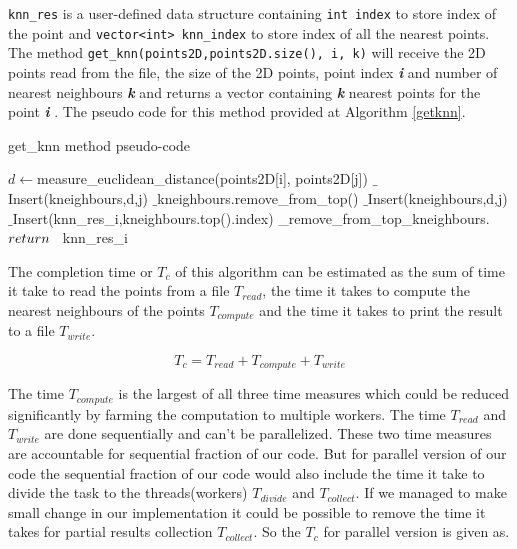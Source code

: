\documentclass[12pt,a4paper]{report}
\begin{document}
\verb!knn_res! is a user-defined data structure containing \verb!int index! to store index of the point and \verb!vector<int> knn_index! to store index of all the nearest points. The method \verb!get_knn(points2D,points2D.size(), i, k)! will receive the 2D points read from the file, the size of the 2D points, point index \textbf{\textit{i}} and number of nearest neighbours \textbf{\textit{k}} and returns a vector containing \textbf{\textit{k}} nearest points for the point \textbf{\textit{i}} . The pseudo code for this method provided at Algorithm \ref{getknn}.

\begin{algorithm}
	\caption{get\_knn method pseudo-code} 
	\begin{algorithmic}[1]
                \State $d \gets $measure\_euclidean\_distance(points2D[i], points2D[j])
                    \State ${\_} $Insert(kneighbours,d,j)
                \EndIf
                \State ${\_} $kneighbours.remove\_from\_top()
                \State ${\_} $Insert(kneighbours,d,j)
            \EndIf
            \EndIf
		\EndFor
	        \State ${\_} $Insert(knn\_res\_i,kneighbours.top().index)
	        \State ${}$\_remove\_from\_top\_kneighbours.
	\EndFor
	\State ${return} \hspace{0.3cm} ${knn\_res\_i}
	\end{algorithmic}
	\label{getknn}
\end{algorithm}

The completion time or $T_c$ of this algorithm can be estimated as the sum of time it take to read the points from a file $T_{read}$, the time it takes to compute the nearest neighbours of the points $T_{compute}$ and the time it takes to print the result to a file $T_{write}$.

\begin{equation}
T_c = T_{read} + T_{compute} + T_{write}
\end{equation}

The time $T_{compute}$ is the largest of all three time measures which could be reduced significantly by farming the computation to multiple workers. The time $T_{read}$ and $T_{write}$ are done sequentially and can't be parallelized. These two time measures are accountable for sequential fraction of our code. But for parallel version of our code the sequential fraction of our code would also include the time it take to divide the task to the threads(workers) $T_{divide}$ and $T_{collect}$. If we managed to make small change in our implementation it could be possible to remove the time it takes for partial results collection $T_{collect}$. So the $T_c$ for parallel version is given as. 
\end{document}
